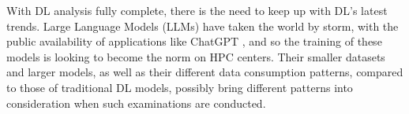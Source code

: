 \documentclass[conference]{IEEEtran}
\begin{document}
With DL analysis fully complete, there is the need to keep up with DL's latest trends. Large Language Models (LLMs) have taken the world by storm, with the public availability of applications like ChatGPT \cite{chatgpt}, and so the training of these models is looking to become the norm on HPC centers. Their smaller datasets and larger models, as well as their different data consumption patterns, compared to those of traditional DL models, possibly bring different patterns into consideration when such examinations are conducted.


\end{document}
